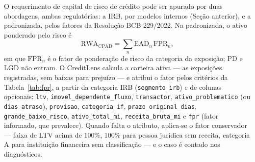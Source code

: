 \documentclass[11pt,a4paper]{article}
\begin{document}
O requerimento de capital de risco de crédito pode ser apurado por duas abordagens, ambas regulatórias: a IRB, por modelos internos (Seção anterior), e a padronizada, pelos fatores da Resolução BCB 229/2022. Na padronizada, o ativo ponderado pelo risco é
\begin{equation}
\mathrm{RWA}_{\mathrm{CPAD}}=\sum_n \mathrm{EAD}_n\,\mathrm{FPR}_n ,
\label{eq:cpad}
\end{equation}
em que $\mathrm{FPR}_n$ é o fator de ponderação de risco da categoria da exposição; PD e LGD não entram. O CreditLens calcula a carteira ativa --- as exposições registradas, sem baixas para prejuízo --- e atribui o fator pelos critérios da Tabela~\ref{tab:fpr}, a partir da categoria IRB (\texttt{segmento\_\allowbreak irb}) e de colunas opcionais: \texttt{ltv}, \texttt{imovel\_\allowbreak dependente\_\allowbreak fluxo}, \texttt{transactor}, \texttt{ativo\_\allowbreak problematico} (ou \texttt{dias\_\allowbreak atraso}), \texttt{provisao}, \texttt{categoria\_\allowbreak if}, \texttt{prazo\_\allowbreak original\_\allowbreak dias}, \texttt{grande\_\allowbreak baixo\_\allowbreak risco}, \texttt{ativo\_\allowbreak total\_\allowbreak mi}, \texttt{receita\_\allowbreak bruta\_\allowbreak mi} e \texttt{fpr} (fator informado, que prevalece). Quando falta o atributo, aplica-se o fator conservador --- faixa de LTV acima de 100\%, 100\% para pessoa jurídica sem receita, categoria A para instituição financeira sem classificação --- e o caso é contado nos diagnósticos.
\end{document}
